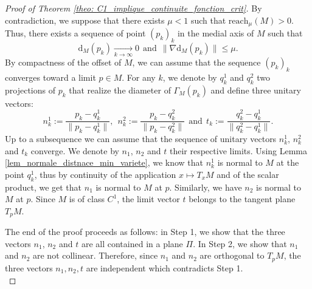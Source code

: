 \documentclass[11pt,reqno,a4paper]{article}%
\theoremstyle{definition}
\theoremstyle{remark}
\renewcommand{\leq}{\leqslant}
\renewcommand{\d}{\mathrm{d}}
\newcommand{\reach}{\mathrm{reach}} %
\renewcommand{\d}{\mathrm{d}}
\begin{document}
\begin{proof}[Proof of Theorem \ref{theo: C1_implique_continuite_fonction_crit}]
By contradiction, we suppose that there exists $\mu < 1$ such that $\reach_\mu(M) > 0$. 
    Thus, there exists a sequence of point $(p_k)_k$ in the medial axis of $M$ such that 
    \[ \d_M(p_k) \underset{k \to \infty}{\longrightarrow} 0 ~~\text{and}~~  \|\nabla \d_M(p_k)\| \leq \mu.\] 
    By compactness of the offset of $M$, we can assume that the sequence $(p_k)_k$ converges toward a limit $p \in M$.
    For any $k$, we denote by $q_k^1$ and $q_k^2$ two projections of $p_k$ that realize the diameter of $\Gamma_M(p_k)$ and define three unitary vectors:
     \[ {n_k^1} := \frac{p_k - q_k^1}{\| p_k - q_k^1 \|}, ~~  {n_k^2} := \frac{p_k - q_k^2}{\| p_k - q_k^2 \|} ~~ \text{and} ~~ {t_k} := \frac{q_k^2 - q_k^1}{\| q_k^2 - q_k^1 \|}.\]
    Up to a subsequence we can assume that the sequence of unitary vectors ${n_k^1}$, ${n_k^2}$ and ${t_k}$ converge. We denote by ${n_1}$, ${n_2}$ and ${t}$ their respective limits.
    Using Lemma \ref{lem_normale_distnace_min_variete}, we know that ${n_k^1}$ is normal to $M$ at the point $q_k^1$, thus by continuity of the application $x \mapsto T_x M$ and of the scalar product, we get that ${n_1}$ is normal to $M$ at $p$. Similarly, we have ${n_2}$ is normal to $M$ at $p$. Since $M$ is of class $C^1$, the limit vector $t$ belongs to the tangent plane $T_pM$.
    
    The end of the proof proceeds as follows: %
    in Step 1, we show that the three vectors ${n_1}$, ${n_2}$ and ${t}$ are all contained in a plane $\Pi$. In Step 2, we show that $n_1$ and $n_2$ are not collinear. Therefore, since $n_1$ and $n_2$ are orthogonal to $T_pM$, the three vectors $n_1,n_2,t$ are independent which contradicts Step 1. \\
   

\end{proof}
\end{document}
